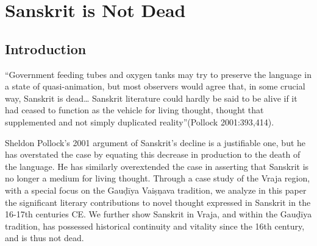 \chapter{Sanskrit is Not Dead}\label{chapter5}


\section*{Introduction}

\begin{myquote}
\eleven
“Government feeding tubes and oxygen tanks may try to preserve the language in a state of quasi-animation, but most observers would agree that, in some crucial way, Sanskrit is dead… Sanskrit literature could hardly be said to be alive if it had ceased to function as the vehicle for living thought, thought that supplemented and not simply duplicated reality”\hfill(Pollock 2001:393,414).
\end{myquote}

Sheldon Pollock’s 2001 argument of Sanskrit’s decline is a justifiable one, but he has overstated the case by equating this decrease in production to the death of the language. He has similarly overextended the case in asserting that Sanskrit is no longer a medium for living thought. Through a case study of the Vraja region, with a special focus on the Gauḍīya Vaiṣṇava tradition, we analyze in this paper the significant literary contributions to novel thought expressed in Sanskrit in the 16-17th centuries CE. We further show Sanskrit in Vraja, and within the Gauḍīya tradition, has possessed historical continuity and vitality since the 16th century, and is thus not dead.
\vskip 2pt

